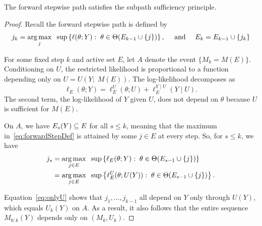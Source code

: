 \documentclass{article}
\begin{document}
\begin{proposition}\label{prop:forwardSSP}
  The forward stepwise path satisfies the subpath sufficiency principle.
\end{proposition}
\begin{proof}
  Recall the forward stepwise path is defined by
  \begin{equation}\label{eq:forwardStepDef}
    j_k = \operatorname*{arg\,max}_j \;\;\sup \left\{\ell(\theta; Y):\; \theta\in\Theta(E_{k-1} \cup \{j\})\right\}, \quad \text{ and } \quad
    E_k = E_{k-1} \cup \{j_k\}
  \end{equation}
  
  For some fixed step $k$ and active set $E$, let $A$ denote the event $\{M_k = M(E)\}$. Conditioning on $U$, the restricted likelihood is proportional to a function depending only on $U = U(Y; \;M(E))$. The log-likelihood decomposes as
  \[
  \ell_E(\theta; Y) = \ell_E^{U}(\theta; U) 
  + \ell_E^{Y \mid U}(Y \mid U).
  \]
  The second term, the log-likelihood of $Y$ given $U$, does not depend on $\theta$ because $U$ is sufficient for $M(E)$.

  On $A$, we have $E_s(Y) \subseteq E$ for all $s\leq k$, meaning that the maximum in~\eqref{eq:forwardStepDef} is attained by some $j\in E$ at every step. So, for $s \leq k$, we have
\begin{align}
  j_s &= \operatorname*{arg\,max}_{j\in E} \;\;\sup \left\{\ell_E(\theta; Y):\;
    \theta\in\Theta(E_{s-1} \cup \{j\})\right\} \\
  &= \operatorname*{arg\,max}_{j\in E} \;\;\sup \left\{\ell_E^U(\theta; U(Y)):\;
    \theta\in\Theta(E_{s-1} \cup \{j\})\right\}. \label{eq:onlyU}
\end{align}

Equation~\eqref{eq:onlyU} shows that $j_1,\ldots, j_{k-1}$ all depend on $Y$ only through $U(Y)$, which equals $U_k(Y)$ on $A$. As a result, it also follows that the entire sequence $M_{0:k}(Y)$ depends only on $(M_k, U_k)$.
\end{proof}

\end{document}
